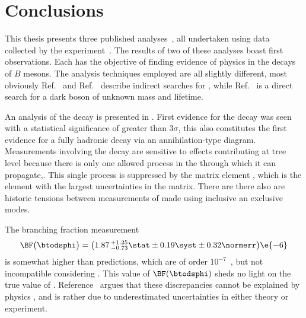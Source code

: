 \chapter{Conclusions}
\label{ch:conc}

This thesis presents three published
analyses~\cite{LHCb-PAPER-2012-025,LHCb-PAPER-2014-030,LHCb-PAPER-2015-036}, all
undertaken using data collected by the \lhcb experiment~\cite{Alves:2008zz}.
The results of two of these analyses boast first observations.
Each has the objective of finding evidence of physics \bsm in the decays of $B$ mesons.
The analysis techniques employed are all slightly different, most obviously
Ref.~\cite{LHCb-PAPER-2012-025} and Ref.~\cite{LHCb-PAPER-2014-030} describe indirect
searches for \np, while Ref.~\cite{LHCb-PAPER-2015-036} is a direct search for a dark boson of
unknown mass and lifetime.

An analysis of the decay \btodsphi is presented in .
First evidence for the decay was seen with a statistical significance of greater than $3\sigma$,
this also constitutes the first evidence for a fully hadronic decay via an annihilation-type
diagram.
Measurements involving the decay \btodsphi are sensitive to \np effects contributing at tree level
because there is only one allowed process in the \sm through which it can propagate,.
This single process is suppressed by the \ckm matrix element , which is the element with the
largest uncertainties in the \ckm matrix.
There are there also are historic tensions
between measurements of  made using inclusive an exclusive modes.

The branching fraction measurement
\begin{equation*}
  \BF\big(\btodsphi\big) =
  \big(1.87\,^{+1.25}_{-0.73}\stat\pm0.19\syst\pm0.32\normerr\big)\e{-6}
\end{equation*}
is somewhat higher than \sm predictions, which are
of order $10^{-7}$~\cite{Zou:2009zza,Mohanta:2002wf,PhysRevD.76.057701,Lu:2001yz}, but
not incompatible considering .
This value of $\BF(\btodsphi)$ sheds no light on the true value of .
Reference~\cite{Crivellin:2014zpa} argues that these
discrepancies cannot be explained by physics \bsm, and is rather due to underestimated
uncertainties in either theory or experiment.

